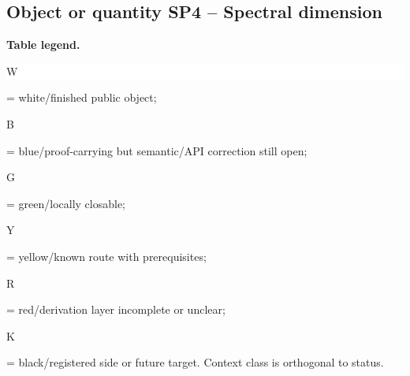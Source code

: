 \subsection*{Object or quantity SP4 -- Spectral dimension}
\hypertarget{objproof:SP4}{}
\par\smallskip\noindent\begin{minipage}{0.99\linewidth}\footnotesize\raggedright\textbf{Table legend.} \colorbox{white}{\strut W} = white/finished public object; \colorbox{cyan!20}{\strut B} = blue/proof-carrying but semantic/API correction still open; \colorbox{green!18}{\strut G} = green/locally closable; \colorbox{yellow!25}{\strut Y} = yellow/known route with prerequisites; \colorbox{red!20}{\strut R} = red/derivation layer incomplete or unclear; \colorbox{black!18}{\strut K} = black/registered side or future target. Context class is orthogonal to status.\end{minipage}\par\vspace{0.25em}
